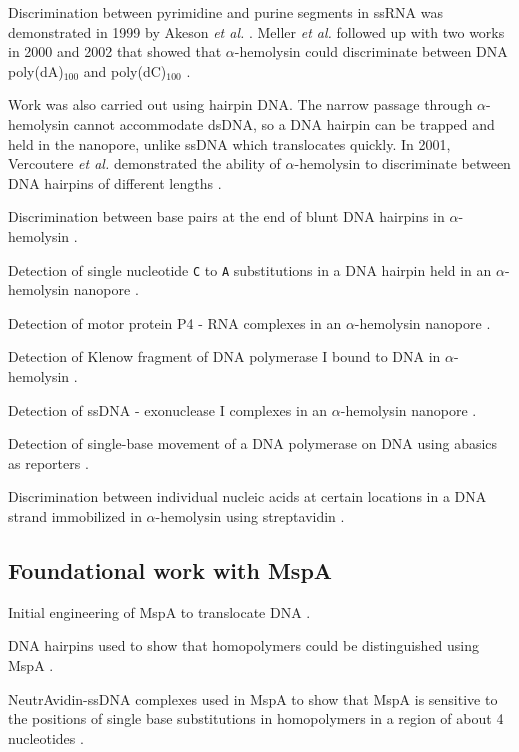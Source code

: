 Discrimination between pyrimidine and purine segments in ssRNA was demonstrated in 1999 by Akeson \textit{et al.} \citep{Akeson1999}.  Meller \textit{et al.} followed up with two works in 2000 and 2002 that showed that $\alpha$-hemolysin could discriminate between DNA poly(dA)$_{100}$ and poly(dC)$_{100}$ \citep{Meller2000, Meller2002}.

Work was also carried out using hairpin DNA.  The narrow passage through $\alpha$-hemolysin cannot accommodate dsDNA, so a DNA hairpin can be trapped and held in the nanopore, unlike ssDNA which translocates quickly.  In 2001, Vercoutere \textit{et al.} demonstrated the ability of $\alpha$-hemolysin to discriminate between DNA hairpins of different lengths \citep{Vercoutere2001}.

Discrimination between base pairs at the end of blunt DNA hairpins in $\alpha$-hemolysin \citep{Vercoutere2003}.

Detection of single nucleotide \texttt{C} to \texttt{A} substitutions in a DNA hairpin held in an $\alpha$-hemolysin nanopore \citep{Ashkenasy2005}.

Detection of motor protein P4 - RNA complexes in an $\alpha$-hemolysin nanopore \citep{Astier2007}.

Detection of Klenow fragment of DNA polymerase I bound to DNA in $\alpha$-hemolysin \citep{Benner2007}.

Detection of ssDNA - exonuclease I complexes in an $\alpha$-hemolysin nanopore \citep{Hornblower2007}.

Detection of single-base movement of a DNA polymerase on DNA using abasics as reporters \citep{Cockroft2008}.

Discrimination between individual nucleic acids at certain locations in a DNA strand immobilized in $\alpha$-hemolysin using streptavidin \citep{Stoddart2009}.

\subsection{Foundational work with MspA}

Initial engineering of MspA to translocate DNA \citep{Butler2008}.

DNA hairpins used to show that homopolymers could be distinguished using MspA \citep{Derrington2010}.

NeutrAvidin-ssDNA complexes used in MspA to show that MspA is sensitive to the positions of single base substitutions in homopolymers in a region of about 4 nucleotides \citep{Manrao2011}.

